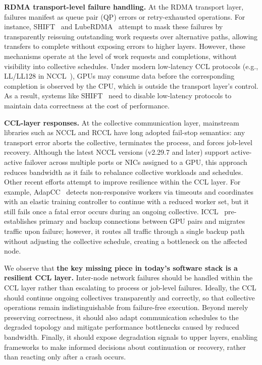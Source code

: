 \smallskip\noindent\textbf{RDMA transport-level failure handling.}
At the RDMA transport layer, failures manifest as queue pair (QP) errors or retry-exhausted operations. For instance, SHIFT~\cite{shift} and LubeRDMA~\cite{luberdma} attempt to mask these failures by transparently reissuing outstanding work requests over alternative paths, allowing transfers to complete without exposing errors to higher layers. However, these mechanisms operate at the level of work requests and completions, without visibility into collective schedules. Under modern low-latency CCL protocols (e.g., LL/LL128 in NCCL~\cite{NCCL}), GPUs may consume data before the corresponding completion is observed by the CPU, which is outside the transport layer's control. As a result, systems like SHIFT~\cite{shift} need to disable low-latency protocols to maintain data correctness at the cost of performance.

\smallskip\noindent\textbf{CCL-layer responses.} At the collective communication layer, mainstream libraries such as NCCL and RCCL have long adopted fail-stop semantics: any transport error aborts the collective, terminates the process, and forces job-level recovery. Although the latest NCCL versions (v2.29.7 and later) support active-active failover across multiple ports or NICs assigned to a GPU, this approach reduces bandwidth as it fails to rebalance collective workloads and schedules. 
Other recent efforts attempt to improve resilience within the CCL layer. For example, AdapCC~\cite{zhao2024adapcc} detects non-responsive workers via timeouts and coordinates with an elastic training controller to continue with a reduced worker set, but it still fails once a fatal error occurs during an ongoing collective. ICCL~\cite{chen2025efficient} pre-establishes primary and backup connections between GPU pairs and migrates traffic upon failure; however, it routes all traffic through a single backup path without adjusting the collective schedule, creating a bottleneck on the affected node.

We observe that \textbf{the key missing piece in today's software stack is a resilient CCL layer.}
Inter-node network failures should be handled within the CCL layer rather than escalating to process or job-level failures. Ideally, the CCL should continue ongoing collectives transparently and correctly, so that collective operations remain indistinguishable from failure-free execution. Beyond merely preserving correctness, it should also adapt communication schedules to the degraded topology and mitigate performance bottlenecks caused by reduced bandwidth. Finally, it should expose degradation signals to upper layers, enabling frameworks to make informed decisions about continuation or recovery, rather than reacting only after a crash occurs.
